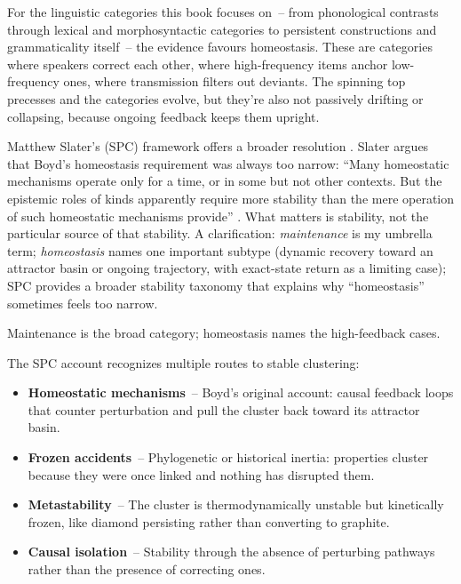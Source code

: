 For the linguistic categories this book focuses on~-- from phonological contrasts through lexical and morphosyntactic categories to persistent constructions and grammaticality itself~-- the evidence favours homeostasis. These are categories where speakers correct each other, where high-frequency items anchor low-frequency ones, where transmission filters out deviants. The spinning top precesses and the categories evolve, but they're also not passively drifting or collapsing, because ongoing feedback keeps them upright.

Matthew Slater's  (SPC) framework offers a broader resolution \citep{slater2015}. Slater argues that Boyd's homeostasis requirement was always too narrow: \enquote{Many homeostatic mechanisms operate only for a time, or in some but not other contexts. But the epistemic roles of kinds apparently require more stability than the mere operation of such homeostatic mechanisms provide} \citep[382--383]{slater2015}. What matters is stability, not the particular source of that stability. A clarification: \emph{maintenance} is my umbrella term; \emph{homeostasis} names one important subtype (dynamic recovery toward an attractor basin or ongoing trajectory, with exact-state return as a limiting case); SPC provides a broader stability taxonomy that explains why \enquote{homeostasis} sometimes feels too narrow.

Maintenance is the broad category; homeostasis names the high-feedback cases.

The SPC account recognizes multiple routes to stable clustering:
\begin{itemize}
\item \textbf{Homeostatic mechanisms}~-- Boyd's original account: causal feedback loops that counter perturbation and pull the cluster back toward its attractor basin.
\item \textbf{Frozen accidents}~-- Phylogenetic or historical inertia: properties cluster because they were once linked and nothing has disrupted them.
\item \textbf{Metastability}~-- The cluster is thermodynamically unstable but kinetically frozen, like diamond persisting rather than converting to graphite.
\item \textbf{Causal isolation}~-- Stability through the absence of perturbing pathways rather than the presence of correcting ones.
\end{itemize}


